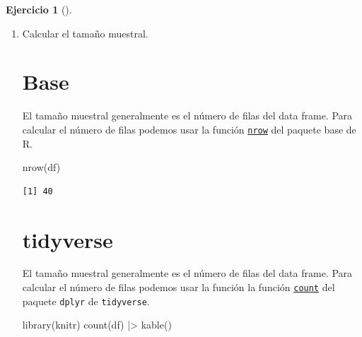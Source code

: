 \documentclass[
  spanish,
  a4paper,
]{scrreport}
\newenvironment{Shaded}{\begin{snugshade}}{\end{snugshade}}
\newcommand{\FunctionTok}[1]{\textcolor[rgb]{0.28,0.35,0.67}{#1}}
\newcommand{\NormalTok}[1]{\textcolor[rgb]{0.00,0.23,0.31}{#1}}
\newcommand{\SpecialCharTok}[1]{\textcolor[rgb]{0.37,0.37,0.37}{#1}}
\theoremstyle{definition}
\newtheorem{exercise}{Ejercicio}[chapter]
\theoremstyle{remark}
\begin{document}
\begin{exercise}[]
\begin{enumerate}
\begin{tcolorbox}
  \end{tcolorbox}
\item
  Calcular el tamaño muestral.

  \begin{tcolorbox}[enhanced jigsaw, colback=white, coltitle=black, toprule=.15mm, rightrule=.15mm, opacitybacktitle=0.6, opacityback=0, bottomtitle=1mm, toptitle=1mm, titlerule=0mm, breakable, leftrule=.75mm, title=\textcolor{quarto-callout-tip-color}{\faLightbulb}\hspace{0.5em}{Solución}, arc=.35mm, left=2mm, bottomrule=.15mm, colframe=quarto-callout-tip-color-frame, colbacktitle=quarto-callout-tip-color!10!white]

  \section{Base}

  El tamaño muestral generalmente es el número de filas del data frame.
  Para calcular el número de filas podemos usar la función
  \href{https://www.rdocumentation.org/packages/base/versions/3.6.2/topics/nrow}{\texttt{nrow}}
  del paquete base de R.

\begin{Shaded}
\begin{Highlighting}[]
\FunctionTok{nrow}\NormalTok{(df)}
\end{Highlighting}
\end{Shaded}

\begin{verbatim}
[1] 40
\end{verbatim}

  \section{tidyverse}

  El tamaño muestral generalmente es el número de filas del data frame.
  Para calcular el número de filas podemos usar la función la función
  \href{https://dplyr.tidyverse.org/reference/count.html}{\texttt{count}}
  del paquete \texttt{dplyr} de \texttt{tidyverse}.

\begin{Shaded}
\begin{Highlighting}[]
\FunctionTok{library}\NormalTok{(knitr)}
\FunctionTok{count}\NormalTok{(df) }\SpecialCharTok{|\textgreater{}} \FunctionTok{kable}\NormalTok{()}
\end{Highlighting}
\end{Shaded}


\end{tcolorbox}
\end{enumerate}
\end{exercise}
\end{document}
